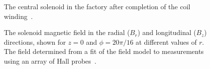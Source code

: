 \begin{figure}[htbp]
	\centering
	\caption{The central solenoid in the factory after completion of the coil winding~\cite{TheATLASCollaboration:2008fg}.}
	\label{fig:solenoid}
\end{figure}

\begin{figure}[htbp]
	\centering
	\caption{The solenoid magnetic field in the radial ($B_r$) and longitudinal ($B_z$) directions, shown for $z=0$ and $\phi=20\pi/16$ at different values of $r$. The field determined from a fit of the field model to measurements using an array of Hall probes~\cite{Aleksa:2008br}.}
	\label{fig:ATLAS-solenoid-Bfield}
\end{figure}



